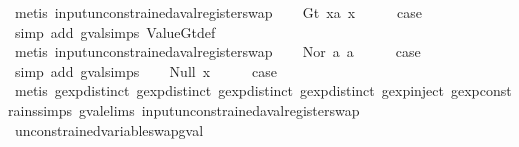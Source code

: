 \begin{isabellebody}
\ {\isacharparenleft}metis\ input{\isacharunderscore}unconstrained{\isacharunderscore}aval{\isacharunderscore}register{\isacharunderscore}swap{\isacharparenright}\isanewline
{}\isamarkupfalse%
\isanewline
\ \ \isamarkupfalse%
\ {\isacharparenleft}Gt\ x{}a\ x{}{\isacharparenright}\isanewline
\ \ \isamarkupfalse%
\ \isamarkupfalse%
\ {\isacharquery}case\isanewline
\ \ \ \ \isamarkupfalse%
\ {\isacharparenleft}simp\ add{\isacharcolon}\ gval{\isachardot}simps\ ValueGt{\isacharunderscore}def{\isacharparenright}\isanewline
\ \ \ \ \isamarkupfalse%
\ {\isacharparenleft}metis\ input{\isacharunderscore}unconstrained{\isacharunderscore}aval{\isacharunderscore}register{\isacharunderscore}swap{\isacharparenright}\isanewline
{}\isamarkupfalse%
\isanewline
\ \ \isamarkupfalse%
\ {\isacharparenleft}Nor\ a{}\ a{}{\isacharparenright}\isanewline
\ \ \isamarkupfalse%
\ \isamarkupfalse%
\ {\isacharquery}case\isanewline
\ \ \ \ \isamarkupfalse%
\ {\isacharparenleft}simp\ add{\isacharcolon}\ gval{\isachardot}simps{\isacharparenleft}{}{\isacharparenright}{\isacharparenright}\isanewline
{}\isamarkupfalse%
\isanewline
\ \ \isamarkupfalse%
\ {\isacharparenleft}Null\ x{\isacharparenright}\isanewline
\ \ \isamarkupfalse%
\ \isamarkupfalse%
\ {\isacharquery}case\isanewline
\ \ \ \ \isamarkupfalse%
\ {\isacharparenleft}metis\ gexp{\isachardot}distinct{\isacharparenleft}{}{}{\isacharparenright}\ gexp{\isachardot}distinct{\isacharparenleft}{}{}{\isacharparenright}\ gexp{\isachardot}distinct{\isacharparenleft}{}{}{\isacharparenright}\ gexp{\isachardot}distinct{\isacharparenleft}{}{\isacharparenright}\ gexp{\isachardot}inject{\isacharparenleft}{}{\isacharparenright}\ gexp{\isacharunderscore}constrains{\isachardot}simps{\isacharparenleft}{}{\isacharparenright}\ gval{\isachardot}elims\ input{\isacharunderscore}unconstrained{\isacharunderscore}aval{\isacharunderscore}register{\isacharunderscore}swap{\isacharparenright}\isanewline
{}\isamarkupfalse%
%
\endisatagproof
{\isafoldproof}%
%
\isadelimproof
\isanewline
%
\endisadelimproof
\isanewline
{}\isamarkupfalse%
\ unconstrained{\isacharunderscore}variable{\isacharunderscore}swap{\isacharunderscore}gval{\isacharcolon}\isanewline

\end{isabellebody}
